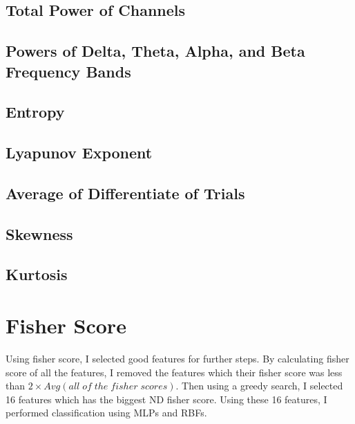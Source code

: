 \documentclass[a4paper, openany]{book}
\begin{document}
\subsection{Total Power of Channels}

\subsection{Powers of Delta, Theta, Alpha, and Beta Frequency Bands }

\subsection{Entropy}

\subsection{Lyapunov Exponent}

\subsection{Average of Differentiate of Trials}


\subsection{Skewness}

\subsection{Kurtosis}

\newpage

\section{Fisher Score}
	\vspace{0.3cm}
	
Using fisher score, I selected good features for further steps. By calculating  fisher score of all the features, I removed the features which their fisher score was less than $2\times Avg(all\;of\;the\;fisher\;scores)$. Then using a greedy search, I selected 16 features which has the biggest ND fisher score. Using these 16 features, I performed classification using MLPs and RBFs.
\end{document}
